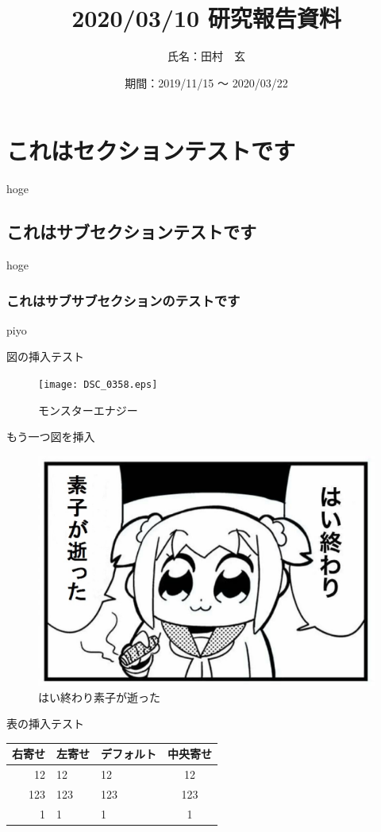 \documentclass[a4j]{jarticle}
\title{2020/03/10 研究報告資料}
\author{氏名：田村　玄}
\date{期間：2019/11/15 ～ 2020/03/22}
\begin{document}
\maketitle

\section{これはセクションテストです}

hoge

\subsection{これはサブセクションテストです}

hoge

\subsubsection{これはサブサブセクションのテストです}

piyo

図の挿入テスト

\begin{figure}
\centering
\texttt{[image: DSC\_0358.eps]}
\caption{モンスターエナジー}
\end{figure}

もう一つ図を挿入

\begin{figure}
\centering
\includegraphics{end.eps}
\caption{はい終わり素子が逝った}
\end{figure}

表の挿入テスト

\begin{longtable}[]{@{}rllc@{}}
\toprule
右寄せ & 左寄せ & デフォルト & 中央寄せ\tabularnewline
\midrule
\endhead
12 & 12 & 12 & 12\tabularnewline
123 & 123 & 123 & 123\tabularnewline
1 & 1 & 1 & 1\tabularnewline
\bottomrule
\end{longtable}
\end{document}
